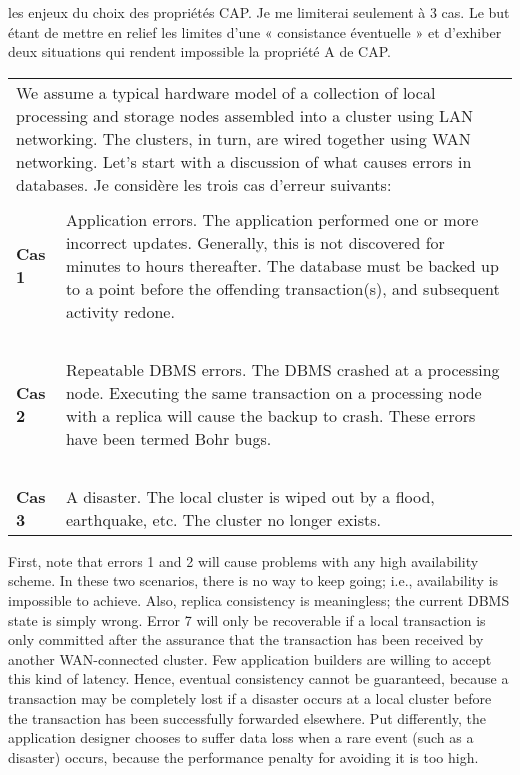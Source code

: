 les enjeux du choix
des propriétés \textsf{CAP}\cite{MichaelStonebraker}. Je me limiterai seulement à
3 cas. Le but étant de mettre en relief les limites d'une « \textsf{consistance éventuelle} »
et d'exhiber deux situations qui rendent impossible la propriété \textsf{A} de \textsf{CAP}.
\def\exemple{We assume a typical hardware model of a
collection of local processing and storage nodes assembled into a cluster using LAN networking.
The clusters, in turn, are wired together using WAN networking.
Let’s start with a discussion of what causes errors in databases. Je considère les trois cas d'erreur suivants:}

\def\casa{Application errors. The application performed one or more incorrect updates. Generally, this is
not discovered for minutes to hours thereafter. The database must be backed up to a point before the offending transaction(s), and subsequent activity redone.}

\def\casb{Repeatable DBMS errors. The DBMS crashed at a processing node. Executing the same
transaction on a processing node with a replica will cause the backup to crash. These errors have
been termed Bohr bugs.}

\def\casc{\sf A disaster. The local cluster is wiped out by a flood, earthquake, etc. The cluster no longer exists.}

\begin{center}
\begin{tabular}{p{1.7cm} p{12cm}}
\multicolumn{2}{p{14cm}}{\sf \exemple}\\&\\  
{\bf Cas 1}  & \textsf{\casa}\\~&~\\
{\bf Cas 2}  & \textsf{\casb}\\~&~\\
{\bf Cas 3}  & \textsf{\casc}\\
\end{tabular}
\end{center}
\noindent
First, note that errors 1 and 2 will cause problems with any high availability scheme. In these two
scenarios, there is no way to keep going; i.e., availability is impossible to achieve. Also, replica
consistency is meaningless; the current DBMS state is simply wrong. Error 7 will only be
recoverable if a local transaction is only committed after the assurance that the transaction has
been received by another WAN-connected cluster. Few application builders are willing to accept this kind of latency. Hence, eventual consistency cannot be guaranteed, because a transaction
may be completely lost if a disaster occurs at a local cluster before the transaction has been
successfully forwarded elsewhere. Put differently, the application designer chooses to suffer data
loss when a rare event (such as a disaster) occurs, because the performance penalty for avoiding it is too high.


